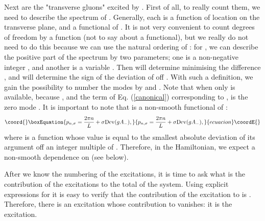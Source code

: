 \documentclass[a4paper,12pt]{article}
\begin{document}
Next are the "transverse gluons" excited by \coordHE{}. 
First of all, to really count them, we need to describe 
the spectrum \coordHE{} of \coordHE{}. Generally, 
each \coordHE{} is a function of location on the transverse plane, 
and a functional of 
\coordHE{}. It is not very convenient to count degrees of freedom by a function
(not to say about a functional), but we really do not need to 
do this because we can 
use the natural ordering of \coordHE{}: for \coordHE{}, 
we can describe the positive part of 
the spectrum by two 
parameters;  one is a 
non-negative integer \coordHE{}, and another is 
a variable \coordHE{}. 
Then \coordHE{} will determine \coordHE{} minimising 
the difference \coordHE{}, and \myHighlight{$\sigma$}\coordHE{} 
will determine the sign of the 
deviation of \coordHE{} off \coordHE{}. With such a definition, 
we gain the possibility to 
number the modes by \coordHE{} and \myHighlight{$\sigma$}\coordHE{}. Note that when \coordHE{} 
only \coordHE{} is available, because 
\coordHE{}, and the term of Eq.
(\ref{canonical}) corresponding to \coordHE{}, \coordHE{} 
is the zero mode \coordHE{}. 
It is important to note that \coordHE{} 
is a non-smooth functional of \coordHE{}:
\begin{equation}\coord{}\boxEquation{
\label{p1}
p_{n,\sigma} = \frac{2\pi n}{L} + \sigma{\rm Dev}(gA_-),
}{
p_{n,\sigma} = \frac{2\pi n}{L} + \sigma{\rm Dev}(gA_-),
}{ecuacion}\coordE{}\end{equation}
where \coordHE{} is a function whose value 
is equal to the smallest absolute deviation of its argument off 
an integer multiple of \coordHE{}. Therefore, in the 
Hamiltonian, we expect a non-smooth dependence on \coordHE{} (see below).

After we know the numbering of the excitations, it is time 
to ask what is the contribution of the excitations 
to the total \coordHE{} of the system. Using explicit 
expressions for \coordHE{} \cite{KMPV} it is easy to verify that 
the contribution of the \coordHE{} excitation to 
\coordHE{} is \coordHE{}. Therefore, there is an excitation 
whose contribution to \coordHE{} vanishes: 
it is the \coordHE{} excitation.
\end{document}
